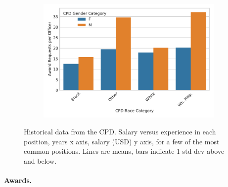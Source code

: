 \begin{figure}[h] 
\begin{subfigure}{0.4\textwidth}
\end{subfigure}
\begin{subfigure}{0.5\textwidth}
\includegraphics[width=\textwidth]{figs/awards} 
\end{subfigure}
\caption{Historical data from the CPD. Salary versus experience in each
position, years x axis, salary (USD) y axis, for a few of the most common
positions. Lines are means, bars indicate 1 std dev above and below.} \label{fig:salary}
\end{figure}

\paragraph{Awards.}


